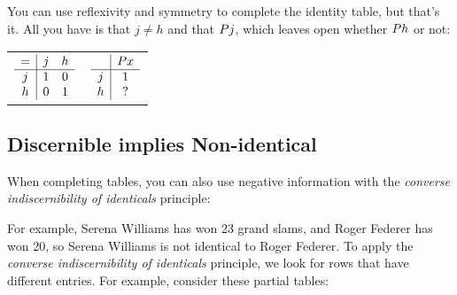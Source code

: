 \documentclass[PHIL101-Textbook.tex]{subfiles}
\begin{document}
\noindent You can use reflexivity and symmetry to complete the identity table, but that's it. All you have is that $j\neq h$ and that $\mathord{P}{j}$, which leaves open whether $\mathord{P}{h}$ or not:


\begin{center}
  \begin{tabular}{ll}
  $\begin{array}{c|cc}
	   = & j & h\\ \hline
	   j &1& 0\\
	   h & 0 & 1
	 \end{array}$  & $\begin{array}{c|c}
	   & \mathord{P}{x} \\ \hline
	   j & 1\\
	   h & ?
	 \end{array}$
  \end{tabular}
\end{center}


\subsection*{Discernible implies Non-identical}
When completing tables, you can also use negative information with the \emph{converse indiscernibility of identicals} principle: 



\noindent For example, Serena Williams has won 23 grand slams, and Roger Federer has won 20, so Serena Williams is not identical to Roger Federer. To apply the \emph{converse indiscernibility of identicals} principle, we look for rows that have different entries.
For example, consider these partial tables: 
\end{document}
